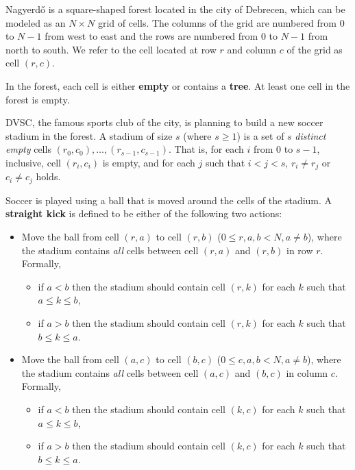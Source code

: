
Nagyerdő is a square-shaped forest located in the city of Debrecen,
which can be modeled as an $N \times N$ grid of cells. The columns of
the grid are numbered from $0$ to $N - 1$ from west to east and the
rows are numbered from $0$ to $N - 1$ from north to south. We refer
to the cell located at row $r$ and column $c$ of the grid as cell
$(r, c)$.

In the forest, each cell is either \textbf{empty} or contains a
\textbf{tree}. At least one cell in the forest is empty.

DVSC, the famous sports club of the city, is planning to build a new
soccer stadium in the forest. A stadium of size $s$ (where
$s \ge 1$) is a set of $s$ \emph{distinct empty} cells
$(r_0, c_0), \ldots, (r_{s - 1}, c_{s - 1})$. That is, for each $i$
from $0$ to $s - 1$, inclusive, cell $(r_i, c_i)$ is empty, and
for each $j$ such that $i < j < s$, $r_i \neq r_j$ or
$c_i \neq c_j$ holds.

Soccer is played using a ball that is moved around the cells of the
stadium. A \textbf{straight kick} is defined to be either of the
following two actions:
\begin{itemize}
  \item Move the ball from cell $(r,a)$ to cell
  $(r,b)$ ($0 \le r,a,b < N, a \ne b$), where the stadium contains
  \emph{all} cells between cell $(r,a)$ and $(r,b)$ in row $r$.
  Formally,
  \begin{itemize}
    \item if $a < b$ then the stadium should contain cell
    $(r,k)$ for each $k$ such that $a \le k \le b$,
    \item if $a > b$
    then the stadium should contain cell $(r,k)$ for each $k$ such that
    $b \le k \le a$.
  \end{itemize}
  \item Move the ball from cell $(a,c)$ to cell $(b,c)$
  ($0 \le c,a,b < N, a \ne b$), where the stadium contains \emph{all}
  cells between cell $(a,c)$ and $(b,c)$ in column $c$. Formally,
  \begin{itemize}
    \item if $a < b$ then the stadium should contain cell $(k,c)$ for each
  $k$ such that $a \le k \le b$,
    \item if $a > b$ then the stadium
  should contain cell $(k,c)$ for each $k$ such that
  $b \le k \le a$.
  \end{itemize}
\end{itemize}


